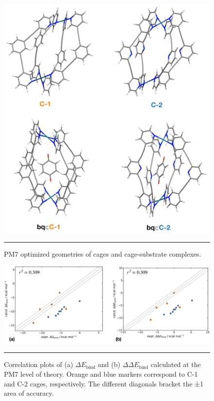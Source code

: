 \documentclass[../../main.tex]{subfiles}
\begin{document}
\begin{figure}[h!]
	\vspace{0.4cm}
	\centering
	\includegraphics[width=13cm]{3/da//figs/figS9}
	\vspace{0.2cm}
	\hrule
	\caption{PM7 optimized geometries of cages and cage-substrate complexes.}
	\label{fig::si_da_9}
\end{figure}


\begin{figure}[h!]
	\vspace{0.4cm}
	\centering
	\includegraphics[width=\textwidth]{3/da//figs/figS10}
	\vspace{0.2cm}
	\hrule
	\caption{Correlation plots of (a) $\Delta E_\text{bind}$ and (b) $\Delta\Delta E_\text{bind}$ calculated at the PM7 level of theory. Orange and blue markers correspond to C-1 and C-2 cages, respectively. The different diagonals bracket the ±1 \kcalx area of accuracy.}
	\label{fig::si_da_10}
\end{figure}
\end{document}
